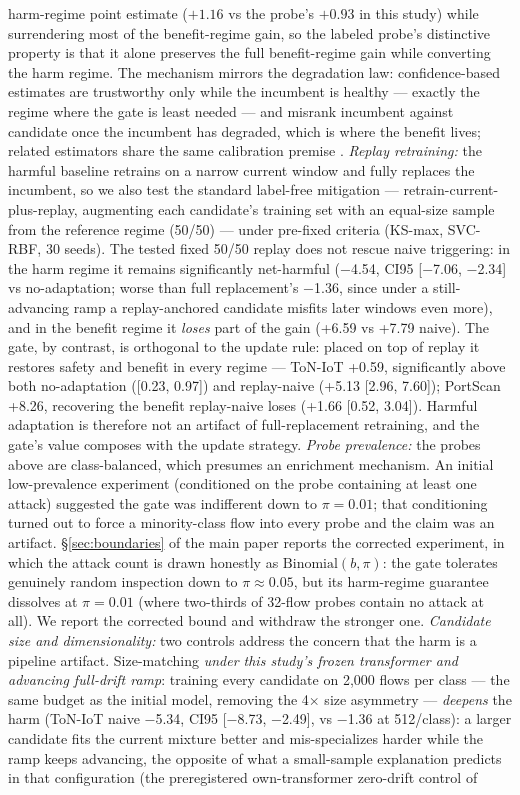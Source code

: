 \documentclass[a4paper,11pt]{article}
\begin{document}
harm-regime point estimate ($+1.16$ vs the probe's $+0.93$ in this study) while surrendering most of the benefit-regime gain, so the labeled probe's distinctive property is that it alone preserves the full benefit-regime gain while converting the harm regime. The mechanism mirrors the degradation law: confidence-based estimates are trustworthy only while the incumbent is healthy --- exactly the regime where the gate is least needed --- and misrank incumbent against candidate once the incumbent has degraded, which is where the benefit lives; related estimators share the same calibration premise \cite{jiang2022disagreement,baek2022agreement,rosenfeld2023dis2,deng2021labels}. \emph{Replay retraining:} the harmful baseline retrains on a narrow current window and fully replaces the incumbent, so we also test the standard label-free mitigation --- retrain-current-plus-replay, augmenting each candidate's training set with an equal-size sample from the reference regime (50/50) --- under pre-fixed criteria (KS-max, SVC-RBF, 30 seeds). The tested fixed 50/50 replay does not rescue naive triggering: in the harm regime it remains significantly net-harmful ($-$4.54, CI95 [$-$7.06, $-$2.34] vs no-adaptation; worse than full replacement's $-$1.36, since under a still-advancing ramp a replay-anchored candidate misfits later windows even more), and in the benefit regime it \emph{loses} part of the gain (+6.59 vs +7.79 naive). The gate, by contrast, is orthogonal to the update rule: placed on top of replay it restores safety and benefit in every regime --- ToN-IoT +0.59, significantly above both no-adaptation ([0.23, 0.97]) and replay-naive (+5.13 [2.96, 7.60]); PortScan +8.26, recovering the benefit replay-naive loses (+1.66 [0.52, 3.04]). Harmful adaptation is therefore not an artifact of full-replacement retraining, and the gate's value composes with the update strategy. \emph{Probe prevalence:} the probes above are class-balanced, which presumes an enrichment mechanism. An initial low-prevalence experiment (conditioned on the probe containing at least one attack) suggested the gate was indifferent down to $\pi=0.01$; that conditioning turned out to force a minority-class flow into every probe and the claim was an artifact. \S\ref{sec:boundaries} of the main paper reports the corrected experiment, in which the attack count is drawn honestly as $\mathrm{Binomial}(b,\pi)$: the gate tolerates genuinely random inspection down to $\pi\approx0.05$, but its harm-regime guarantee dissolves at $\pi=0.01$ (where two-thirds of 32-flow probes contain no attack at all). We report the corrected bound and withdraw the stronger one. \emph{Candidate size and dimensionality:} two controls address the concern that the harm is a pipeline artifact. Size-matching \emph{under this study's frozen transformer and advancing full-drift ramp}: training every candidate on 2{,}000 flows per class --- the same budget as the initial model, removing the 4$\times$ size asymmetry --- \emph{deepens} the harm (ToN-IoT naive $-$5.34, CI95 [$-$8.73, $-$2.49], vs $-$1.36 at 512/class): a larger candidate fits the current mixture better and mis-specializes harder while the ramp keeps advancing, the opposite of what a small-sample explanation predicts in that configuration (the preregistered own-transformer zero-drift control of 
\end{document}
